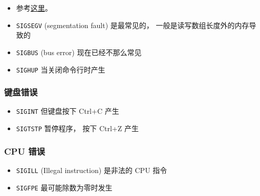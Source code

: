 
\begin{issues}
\issueDraft
\end{issues}

\begin{itemize}
\item 参考\href{https://unix.stackexchange.com/questions/6332/what-causes-various-signals-to-be-sent}{这里}。
\item \verb|SIGSEGV| (segmentation fault) 是最常见的， 一般是读写数组长度外的内存导致的
\item \verb|SIGBUS| (bus error) 现在已经不那么常见
\item \verb|SIGHUP| 当关闭命令行时产生
\end{itemize}

\subsubsection{键盘错误}
\begin{itemize}
\item \verb|SIGINT| 但键盘按下 Ctrl+C 产生
\item \verb|SIGTSTP| 暂停程序， 按下 Ctrl+Z 产生
\end{itemize}

\subsubsection{CPU 错误}
\begin{itemize}
\item \verb|SIGILL| (Illegal instruction) 是非法的 CPU 指令
\item \verb|SIGFPE| 最可能除数为零时发生
\end{itemize}

